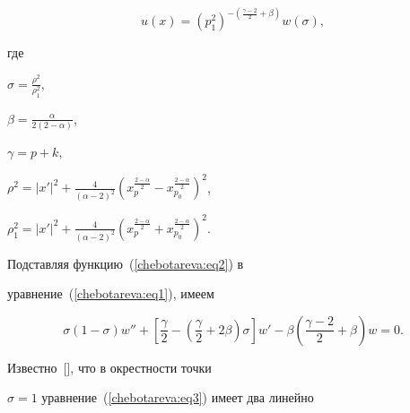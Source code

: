 \begin{equation}


\label{chebotareva:eq2} u\left( x \right) = \left( {p_1^2 }


\right)^{ - \left( {\frac{\gamma - 2}{2} + \beta } \right)}w\left(


\sigma \right), 


\end{equation}


где


$\sigma = \frac{\rho ^2}{\rho _1^2 }$,  


$


\beta = \frac{\alpha }{2\left( {2 - \alpha } \right)}$, 


$\gamma = p + k, 


$


$\rho ^2 = \left| {x'}


\right|^2 + \frac{4}{\left( {\alpha - 2} \right)^2}\left(


{x_p^{\frac{2 - \alpha }{2}} - x_{p_0 }^{\frac{2 - \alpha }{2}} }


\right)^2$, 


 $\rho _1^2 = \left| {x'} \right|^2 +


\frac{4}{\left( {\alpha - 2} \right)^2}\left( {x_p^{\frac{2 -


\alpha }{2}} + x_{p_0 }^{\frac{2 - \alpha }{2}} } \right)^2$.








Подставляя функцию~(\ref{chebotareva:eq2}) в


уравнение~(\ref{chebotareva:eq1}),  имеем


\begin{equation}


\label{chebotareva:eq3} \sigma \left( {1 - \sigma } \right)w'' +


\left[ {\frac{\gamma }{2} - \left( {\frac{\gamma }{2} + 2\beta }


\right)\sigma } \right]w' - \beta \left( {\frac{\gamma - 2}{2} +


\beta } \right)w = 0.


\end{equation}





Известно~[],  что в окрестности точки


$\sigma=1$ уравнение~(\ref{chebotareva:eq3}) имеет два линейно


